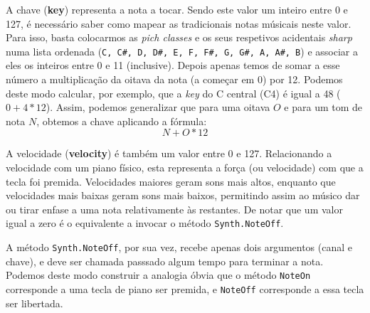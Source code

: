 A chave (\textbf{key}) representa a nota a tocar. Sendo este valor um inteiro entre 0 e 127, é necessário saber como mapear as tradicionais notas músicais neste valor. Para isso, basta colocarmos as \textit{pich classes} e os seus respetivos acidentais \textit{sharp} numa lista ordenada (\verb|C, C#, D, D#, E, F, F#, G, G#, A, A#, B|) e associar a eles os inteiros entre 0 e 11 (inclusive). Depois apenas temos de somar a esse número a multiplicação da oitava da nota (a começar em 0) por 12. Podemos deste modo calcular, por exemplo, que a \textit{key} do C central (C4) é igual a 48 ($0 + 4 * 12$). Assim, podemos generalizar que para uma oitava $O$ e para um tom de nota $N$, obtemos a chave aplicando a fórmula:
$$N + O * 12$$

A velocidade (\textbf{velocity}) é também um valor entre 0 e 127. Relacionando a velocidade com um piano físico, esta representa a força (ou velocidade) com que a tecla foi premida. Velocidades maiores geram sons mais altos, enquanto que velocidades mais baixas geram sons mais baixos, permitindo assim ao músico dar ou tirar enfase a uma nota relativamente às restantes. De notar que um valor igual a zero é o equivalente a invocar o método \texttt{Synth.NoteOff}.

A método \texttt{Synth.NoteOff}, por sua vez, recebe apenas dois argumentos (canal e chave), e deve ser chamada passsado algum tempo para terminar a nota. Podemos deste modo construir a analogia óbvia que o método \texttt{NoteOn} corresponde a uma tecla de piano ser premida, e \texttt{NoteOff} corresponde a essa tecla ser libertada.
